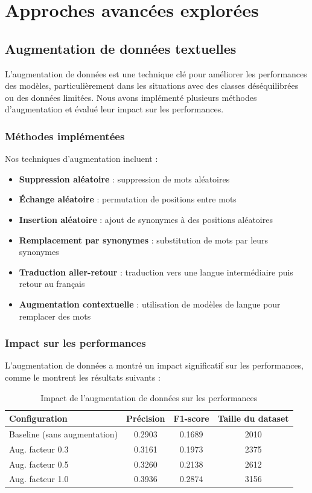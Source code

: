 \documentclass[a4paper,11pt]{article}
\begin{document}
\section{Approches avancées explorées}
\label{sec:advanced}

\subsection{Augmentation de données textuelles}
\label{subsec:augmentation}

L'augmentation de données est une technique clé pour améliorer les performances des modèles, particulièrement dans les situations avec des classes déséquilibrées ou des données limitées. Nous avons implémenté plusieurs méthodes d'augmentation et évalué leur impact sur les performances.

\subsubsection{Méthodes implémentées}
Nos techniques d'augmentation incluent :

\begin{itemize}
    \item \textbf{Suppression aléatoire} : suppression de mots aléatoires
    \item \textbf{Échange aléatoire} : permutation de positions entre mots
    \item \textbf{Insertion aléatoire} : ajout de synonymes à des positions aléatoires
    \item \textbf{Remplacement par synonymes} : substitution de mots par leurs synonymes
    \item \textbf{Traduction aller-retour} : traduction vers une langue intermédiaire puis retour au français
    \item \textbf{Augmentation contextuelle} : utilisation de modèles de langue pour remplacer des mots
\end{itemize}

\subsubsection{Impact sur les performances}
L'augmentation de données a montré un impact significatif sur les performances, comme le montrent les résultats suivants :

\begin{table}[h]
\centering
\begin{tabular}{lccc}
\toprule
\textbf{Configuration} & \textbf{Précision} & \textbf{F1-score} & \textbf{Taille du dataset} \\
\midrule
Baseline (sans augmentation) & 0.2903 & 0.1689 & 2010 \\
Aug. facteur 0.3 & 0.3161 & 0.1973 & 2375 \\
Aug. facteur 0.5 & 0.3260 & 0.2138 & 2612 \\
Aug. facteur 1.0 & 0.3936 & 0.2874 & 3156 \\
\bottomrule
\end{tabular}
\caption{Impact de l'augmentation de données sur les performances}
\label{tab:augmentation-results}
\end{table}
\end{document}
